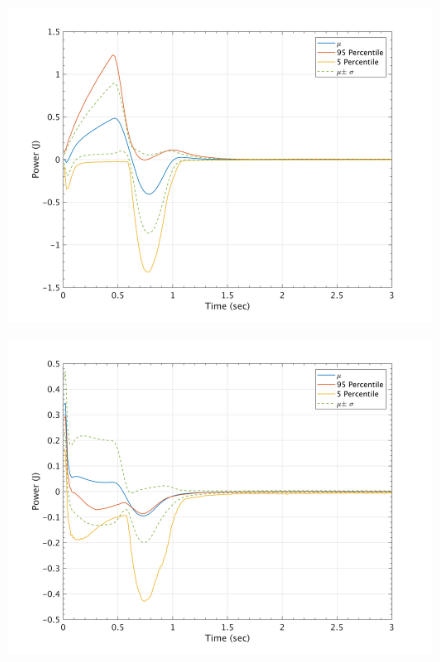 \documentclass{article}
\begin{document}
\begin{figure}[H]
        \begin{minipage}[b]{0.5\linewidth}
                \centering
                \includegraphics[width=1\textwidth]{InclinedPlane/GlobalRecords/C_Global_Ptot.png}
                \label{fig:Ramp-SP-Power-C}
        \end{minipage}
        \begin{minipage}[b]{0.5\linewidth}
                \centering
                \includegraphics[width=1\textwidth]{InclinedPlane/GlobalRecords/P_Global_Ptot.png}
                \label{fig:Ramp-SP-Power-P}
        \end{minipage}


\end{figure}
\end{document}
